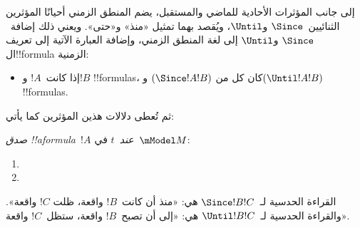 \documentclass[../../../include/open-logic-section]{subfiles}
\begin{document}


إلى جانب المؤثرات الأحادية للماضي والمستقبل، يضم المنطق الزمني أحيانًا
المؤثرين الثنائيين~$\Since$ و$\Until$، ويُقصد بهما تمثيل «منذ» و«حتى».
ويعني ذلك إضافة~$\Since$ و$\Until$ إلى لغة المنطق الزمني، وإضافة العبارة
الآتية إلى تعريف ال!!{formula} الزمنية:

\begin{itemize}
\item[] إذا كانت~$!A$ و$!B$ !!{formula}s، كان كل من
  $(\Since !A !B)$ و$(\Until !A !B)$ !!{formula}s.
\end{itemize}

ثم تُعطى دلالات هذين المؤثرين كما يأتي:

\begin{defn}
  \emph{صدق !!a{formula}~$!A$ عند~$t$} في~$\mModel M$:
  \begin{enumerate}
  \item{} 
  \item{} 
  \end{enumerate}
\end{defn}

القراءة الحدسية لـ~$\Since !B !C$ هي: «منذ أن كانت~$!B$ واقعة، ظلت
$!C$ واقعة». والقراءة الحدسية لـ~$\Until !B !C$ هي: «إلى أن تصبح~$!B$
واقعة، ستظل~$!C$ واقعة».
\end{document}

